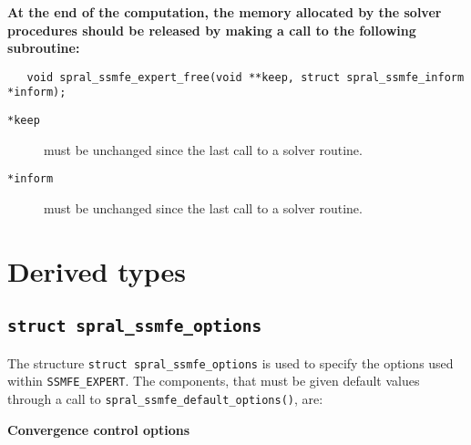 {\bf
At the end of the computation, the memory 
allocated by the solver procedures
should be released
by making a call to the following subroutine:
}

\begin{verbatim}
   void spral_ssmfe_expert_free(void **keep, struct spral_ssmfe_inform *inform);
\end{verbatim}

\begin{description}
%
\item[\texttt{*keep}] must be unchanged since the last call to a solver routine.
%
\item[\texttt{*inform}]  must be unchanged since the last call to a solver routine.
%
\end{description}

\section{Derived types}

\subsection{\texttt{struct spral\_ssmfe\_options}}
\label{ssmfe_expert:type:options}

The structure {\tt struct spral\_ssmfe\_options} is used to specify
the options used within {\tt SSMFE\_EXPERT}. The components, that must be given
default values through a call to \texttt{spral\_ssmfe\_default\_options()}, are:

\bigskip
\noindent
{\bf Convergence control options}


